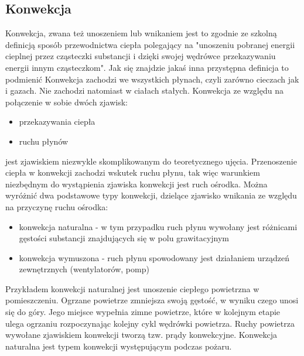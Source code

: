 \subsection{Konwekcja}
\label{Konwekcja}
Konwekcja, zwana też unoszeniem lub wnikaniem jest to zgodnie ze szkolną definicją sposób przewodnictwa ciepła polegający na
"unoszeniu pobranej energii cieplnej przez cząsteczki substancji i dzięki swojej wędrówce przekazywaniu
energii innym cząsteczkom". 
Jak się znajdzie jakaś inna przystępna definicja to podmienić
Konwekcja zachodzi we wszystkich płynach, czyli zarówno cieczach jak i gazach. Nie zachodzi natomiast w ciałach stałych.
Konwekcja ze względu na połączenie w sobie dwóch zjawisk: 
\begin{itemize}
\item przekazywania ciepła
\item ruchu płynów
\end{itemize}
jest zjawiskiem niezwykle skomplikowanym do teoretycznego ujęcia. Przenoszenie ciepła w konwekcji zachodzi 
wskutek ruchu płynu, tak więc warunkiem niezbędnym do wystąpienia zjawiska konwekcji jest ruch ośrodka.
Można wyróżnić dwa podstawowe typy konwekcji, dzielące zjawisko wnikania ze względu na przyczynę ruchu ośrodka:
\begin{itemize}
\item konwekcja naturalna - w tym przypadku ruch płynu wywołany jest różnicami gęstości substancji znajdujących się w polu grawitacyjnym
\item konwekcja wymuszona - ruch płynu spowodowany jest działaniem urządzeń zewnętrznych (wentylatorów, pomp)
\end {itemize}
Przykładem konwekcji naturalnej jest unoszenie ciepłego powietrzna w pomieszczeniu. 
Ogrzane powietrze zmniejsza swoją gęstość, w wyniku czego unosi się do góry. Jego miejsce wypełnia zimne powietrze, 
które w kolejnym etapie ulega ogrzaniu rozpoczynając kolejny cykl wędrówki powietrza. Ruchy powietrza wywołane zjawiskiem 
konwekcji tworzą tzw. prądy konwekcyjne.
 Konwekcja naturalna jest typem konwekcji występującym podczas pożaru. 

